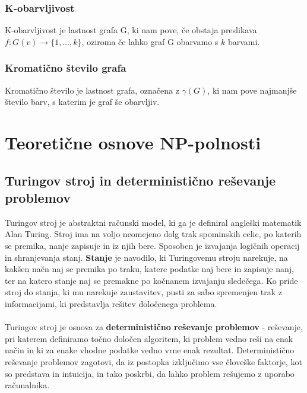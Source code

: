\documentclass[11pt]{article}
\begin{document}
\subsubsection{K-obarvljivost}

K-obarvljivost je lastnost grafa G, ki nam pove, če obstaja preslikava $f: G(v) \rightarrow \{1, \dots, k\}$, oziroma če lahko graf G obarvamo s $k$ barvami. \cite{studentka, barvanjeWiki}

\subsubsection{Kromatično število grafa}

Kromatično število je lastnost grafa, označena z $\gamma(G)$, ki nam pove najmanjše število barv, s katerim je graf še obarvljiv. \cite{studentka, barvanjeWiki}

\section{Teoretične osnove NP-polnosti}


\subsection{Turingov stroj in deterministično reševanje problemov}

Turingov stroj je abstraktni računski model, ki ga je definiral angleški matematik Alan Turing. Stroj ima na voljo neomejeno dolg trak spominskih celic, po katerih se premika, nanje zapisuje in iz njih bere. Sposoben je izvajanja logičnih operacij in shranjevanja stanj. \textbf{Stanje} je navodilo, ki Turingovemu stroju narekuje, na kakšen načn naj se premika po traku, katere podatke naj bere in zapisuje nanj, ter na katero stanje naj se premakne po kočnanem izvajanju sledečega. Ko pride stroj do stanja, ki mu narekuje zaustavitev, pusti za sabo spremenjen trak z informacijami, ki predstavlja rešitev določenega problema.
\\ \\
Turingov stroj je osnova za \textbf{deterministično reševanje problemov} - reševanje, pri katerem definiramo točno določen algoritem, ki problem vedno reši na enak način in ki za enake vhodne podatke vedno vrne enak rezultat. Deterministično reševanje problemov zagotovi, da iz postopka izključimo vse človeške faktorje, kot so predstava in intuicija, in tako poskrbi, da lahko problem rešujemo z uporabo računalnika. \cite{TuringMachine, TuringVideo}
\end{document}
